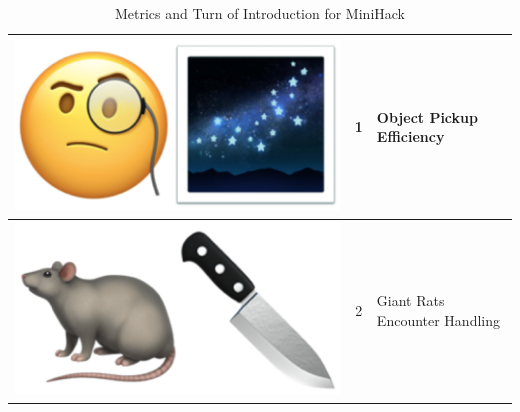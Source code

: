 \begin{table}[ht]
\begin{tabular}{|c|c|l|}
\hline
\rowcolor{gray!30} \includegraphics[scale=0.07]{figs/emojis/mini_8.png} & 1 & Object Pickup Efficiency \\
\hline
\rowcolor{gray!60} \includegraphics[scale=0.07]{figs/emojis/mini_9.png} & 2 & Giant Rats Encounter Handling \\
\hline
\end{tabular}
\caption{Metrics and Turn of Introduction for MiniHack}
\end{table}

